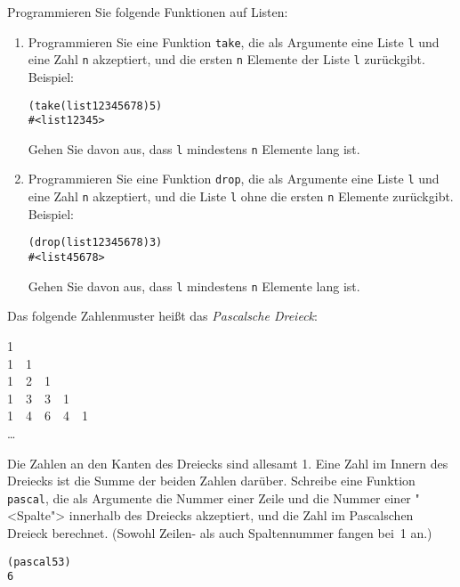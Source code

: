 \begin{aufgabe}
  Programmieren Sie folgende Funktionen auf Listen:
  \begin{enumerate}
  \item Programmieren Sie eine Funktion \texttt{take}, die als
    Argumente eine Liste \texttt{l} und eine Zahl \texttt{n}
    akzeptiert, und die ersten \texttt{n} Elemente der Liste
    \texttt{l} zurückgibt. Beispiel:
    \begin{alltt}
      (take (list 1 2 3 4 5 6 7 8) 5)
      \evalsto{} #<list 1 2 3 4 5>
    \end{alltt}
    Gehen Sie davon aus, dass \texttt{l} mindestens \texttt{n}
    Elemente lang ist.

  \item Programmieren Sie eine Funktion \texttt{drop}, die als
    Argumente eine Liste \texttt{l} und eine Zahl \texttt{n}
    akzeptiert, und die Liste \texttt{l} ohne die ersten \texttt{n}
    Elemente zurückgibt.  Beispiel:
    \begin{alltt}
      (drop (list 1 2 3 4 5 6 7 8) 3)
      \evalsto{} #<list 4 5 6 7 8>
    \end{alltt}
    Gehen Sie davon aus, dass \texttt{l} mindestens \texttt{n}
    Elemente lang ist.
    \end{enumerate}
\end{aufgabe}

\begin{aufgabe}
  Das folgende Zahlenmuster heißt das \textit{Pascalsche
    Dreieck}:
  \begin{center}
    1\\
    1~~1\\
    1~~2~~1\\
    1~~3~~3~~1\\
    1~~4~~6~~4~~1\\
    \ldots
  \end{center}
  Die Zahlen an den Kanten des Dreiecks sind allesamt 1.  Eine Zahl im
  Innern des Dreiecks ist die Summe der beiden Zahlen darüber.
  Schreibe eine Funktion \texttt{pascal}, die als Argumente die Nummer
  einer Zeile und die Nummer einer "<Spalte"> innerhalb des Dreiecks
  akzeptiert, und die Zahl im Pascalschen Dreieck berechnet.  (Sowohl
  Zeilen- als auch Spaltennummer fangen bei~1 an.)
%
\begin{alltt}
(pascal 5 3)
\evalsto{} 6
\end{alltt}
\end{aufgabe}

